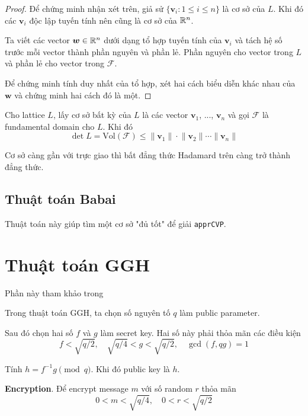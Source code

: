 \begin{proof}
    Để chứng minh nhận xét trên, giả sử $\{ \bm{v}_i : 1 \leqslant i \leqslant n \}$ là cơ sở của $L$. Khi đó các $\bm{v}_i$ độc lập tuyến tính nên cũng là cơ sở của $\mathbb{R}^n$.

    Ta viết các vector $\bm{w} \in \mathbb{R}^n$ dưới dạng tổ hợp tuyến tính của $\bm{v}_i$ và tách hệ số trước mỗi vector thành phần nguyên và phần lẻ. Phần nguyên cho vector trong $L$ và phần lẻ cho vector trong $\mathcal{F}$.

    Để chứng minh tính duy nhất của tổ hợp, xét hai cách biểu diễn khác nhau của $\bm{w}$ và chứng minh hai cách đó là một.
\end{proof}

\begin{theorem}
    Cho lattice $L$, lấy cơ sở bất kỳ của $L$ là các vector $\bm{v}_1$, ..., $\bm{v}_n$ và gọi $\mathcal{F}$ là fundamental domain cho $L$. Khi đó
    \begin{equation}
        \det L = \text{Vol} (\mathcal{F}) \leqslant \lVert \bm{v}_1 \rVert \cdot \lVert \bm{v}_2 \rVert \cdots \lVert \bm{v}_n \rVert
    \end{equation}
\end{theorem}

Cơ sở càng gần với trực giao thì bất đẳng thức Hadamard trên càng trở thành đẳng thức.

\subsection*{Thuật toán Babai}

Thuật toán này giúp tìm một cơ sở "đủ tốt" để giải \texttt{apprCVP}.

\section{Thuật toán GGH}

Phần này tham khảo trong \cite{Hoffstein2014}

Trong thuật toán GGH, ta chọn số nguyên tố $q$ làm public parameter.

Sau đó chọn hai số $f$ và $g$ làm secret key. Hai số này phải thỏa mãn các điều kiện \[ f < \sqrt{q/2}, \quad \sqrt{q/4} < g < \sqrt{q/2}, \quad \gcd(f, qg) = 1 \]

Tính $h = f^{-1} g \pmod q$. Khi đó public key là $h$.

\textbf{Encryption}. Để encrypt message $m$ với số random $r$ thỏa mãn \[ 0 < m < \sqrt{q/4}, \quad 0 < r < \sqrt{q/2} \]

